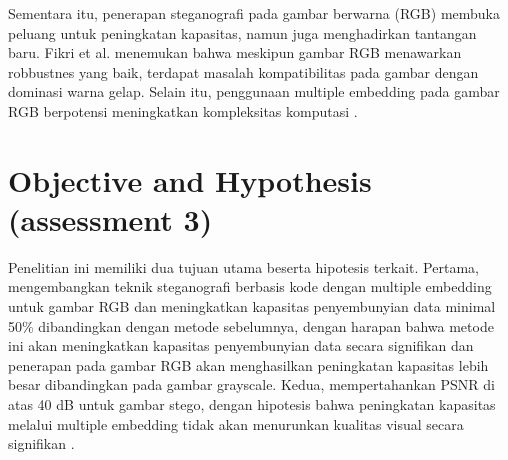 \documentclass{ittelkom}
\begin{document}
Sementara itu, penerapan steganografi pada gambar berwarna (RGB) membuka
peluang untuk peningkatan kapasitas, namun juga menghadirkan tantangan baru.
Fikri et al. \cite{fikri2022optimasi} menemukan bahwa meskipun gambar RGB
menawarkan robbustnes yang baik, terdapat masalah kompatibilitas pada gambar
dengan dominasi warna gelap. Selain itu, penggunaan multiple embedding pada
gambar RGB berpotensi meningkatkan kompleksitas komputasi
\cite{juneja2013improved}.

\section{Objective and Hypothesis \color{red}(assessment 3)} \label{hyp}

Penelitian ini memiliki dua tujuan utama beserta hipotesis terkait. Pertama,
mengembangkan teknik steganografi berbasis kode dengan multiple embedding untuk
gambar RGB dan meningkatkan kapasitas penyembunyian data minimal 50\%
dibandingkan dengan metode sebelumnya, dengan harapan bahwa metode ini akan
meningkatkan kapasitas penyembunyian data secara signifikan dan penerapan pada
gambar RGB akan menghasilkan peningkatan kapasitas lebih besar dibandingkan
pada gambar grayscale. Kedua, mempertahankan PSNR di atas 40 dB untuk gambar
stego, dengan hipotesis bahwa peningkatan kapasitas melalui multiple embedding
tidak akan menurunkan kualitas visual secara signifikan
\cite{nasution2018image}.

\end{document}
